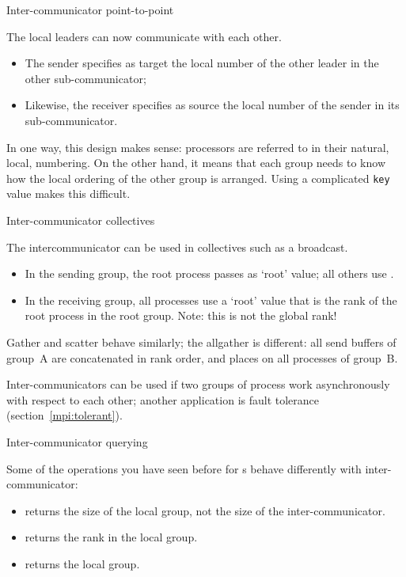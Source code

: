  {Inter-communicator point-to-point}

The local leaders can now communicate with each other.
\begin{itemize}
\item The sender specifies as target the local number of the other
  leader in the other sub-communicator;
\item Likewise, the receiver specifies as source the local number of
  the sender in its sub-communicator.
\end{itemize}
In one way, this design makes sense: processors are referred to in
their natural, local, numbering.
On the other hand, it means that each group needs to know how the
local ordering of the other group is arranged. Using a complicated
\lstinline{key} value makes this difficult.


 {Inter-communicator collectives}

The intercommunicator can be used in collectives such as
a broadcast.

\begin{itemize}
\item In the sending group, the root process passes  as
  `root' value; all others use .
\item In the receiving group, all processes use a `root' value that is the
  rank of the root process in the root group. Note: this is not the
  global rank!
\end{itemize}
Gather and scatter behave similarly; the allgather is different: all
send buffers of group~A are concatenated in rank order, and places on
all processes of group~B.

Inter-communicators can be used if two groups of process work
asynchronously with respect to each other; another application is
fault tolerance (section~\ref{mpi:tolerant}).


 {Inter-communicator querying}
\label{sec:mpi-inter-query}

Some of the operations you have seen before for
s behave differently with inter-communicator:
\begin{itemize}
\item {} returns the size of the local
  group, not the size of the inter-communicator.
\item {} returns the rank in the local
  group.
\item {} returns the local group.
\end{itemize}

